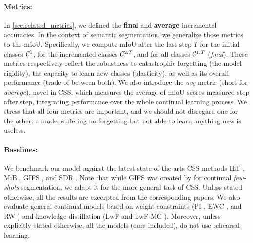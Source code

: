 \paragraph{Metrics:} In \autoref{sec:related_metrics}, we defined the \textbf{final} and
\textbf{average} incremental accuracies. In the context of semantic segmentation, we generalize
those metrics to the \acf{mIoU}. Specifically, we compute \ac{mIoU} after the last step $T$ for the
initial classes $\mathcal{C}^{1}$, for the incremented classes $\mathcal{C}^{2:T}$, and for all classes
$\mathcal{C}^{1:T}$ (\textit{final}). These metrics respectively reflect the robustness to catastrophic
forgetting (the model rigidity), the capacity to learn new classes (plasticity), as well as its
overall performance (trade-of between both). We also introduce the \textit{avg} metric (short for
\textit{average}), novel in \ac{CSS}, which measures the average of \ac{mIoU} scores measured step
after step, integrating performance over the whole continual learning process. We stress that all
four metrics are important, and we should not disregard one for the other: a model suffering no
forgetting but not able to learn anything new is useless.

\paragraph{Baselines:} We benchmark our model against the latest state-of-the-arts \ac{CSS} methods
ILT \citep{michieli2019ilt}, MiB \citep{cermelli2020modelingthebackground}, GIFS
\citep{cermelli2020fewshotcontinualsegm}, and SDR \citep{michieli2021sdr}. Note that while GIFS was
created by \citet{cermelli2020fewshotcontinualsegm} for continual \textit{few-shots} segmentation, we
adapt it for the more general task of \ac{CSS}. Unless stated otherwise, all the results are
excerpted from the corresponding papers. We also evaluate general continual models based on weight
constraints (PI \citep{zenke2017synaptic_intelligence}, EWC \citep{kirkpatrick2017ewc}, and RW
\citep{chaudhry2018riemannien_walk}) and knowledge distillation (LwF \citep{li2018lwf} and LwF-MC
\citep{rebuffi2017icarl}). Moreover, unless explicitly stated otherwise, all the models (ours
included), do not use rehearsal learning.


